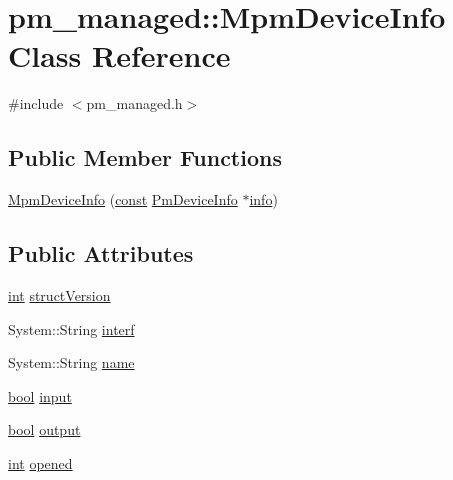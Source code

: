 \hypertarget{classpm__managed_1_1_mpm_device_info}{}\section{pm\+\_\+managed\+:\+:Mpm\+Device\+Info Class Reference}
\label{classpm__managed_1_1_mpm_device_info}


{\ttfamily \#include $<$pm\+\_\+managed.\+h$>$}

\subsection*{Public Member Functions}
\begin{DoxyCompactItemize}
\item 
\hyperlink{classpm__managed_1_1_mpm_device_info_a39458c92ee16803855054902e9a1c47d}{Mpm\+Device\+Info} (\hyperlink{getopt1_8c_a2c212835823e3c54a8ab6d95c652660e}{const} \hyperlink{struct_pm_device_info}{Pm\+Device\+Info} $\ast$\hyperlink{lib_2expat_8h_a20806b446e455c50dc5653b7d43e3de2}{info})
\end{DoxyCompactItemize}
\subsection*{Public Attributes}
\begin{DoxyCompactItemize}
\item 
\hyperlink{xmltok_8h_a5a0d4a5641ce434f1d23533f2b2e6653}{int} \hyperlink{classpm__managed_1_1_mpm_device_info_aef7846288782a1cf3419820db7c780f6}{struct\+Version}
\item 
System\+::\+String \hyperlink{classpm__managed_1_1_mpm_device_info_a033899e3bff73e917b8c15814851f47c}{interf}
\item 
System\+::\+String \hyperlink{classpm__managed_1_1_mpm_device_info_ace3c04e502bc1458af907bc98b06ecc7}{name}
\item 
\hyperlink{mac_2config_2i386_2lib-src_2libsoxr_2soxr-config_8h_abb452686968e48b67397da5f97445f5b}{bool} \hyperlink{classpm__managed_1_1_mpm_device_info_a6e55c359a0b19fb10624b49faeeccb28}{input}
\item 
\hyperlink{mac_2config_2i386_2lib-src_2libsoxr_2soxr-config_8h_abb452686968e48b67397da5f97445f5b}{bool} \hyperlink{classpm__managed_1_1_mpm_device_info_acc3fb0bf6e92088536d694ba2556f4d4}{output}
\item 
\hyperlink{xmltok_8h_a5a0d4a5641ce434f1d23533f2b2e6653}{int} \hyperlink{classpm__managed_1_1_mpm_device_info_a8d15bf067a4d77edf7e42e2b1b4b0ab6}{opened}
\end{DoxyCompactItemize}


